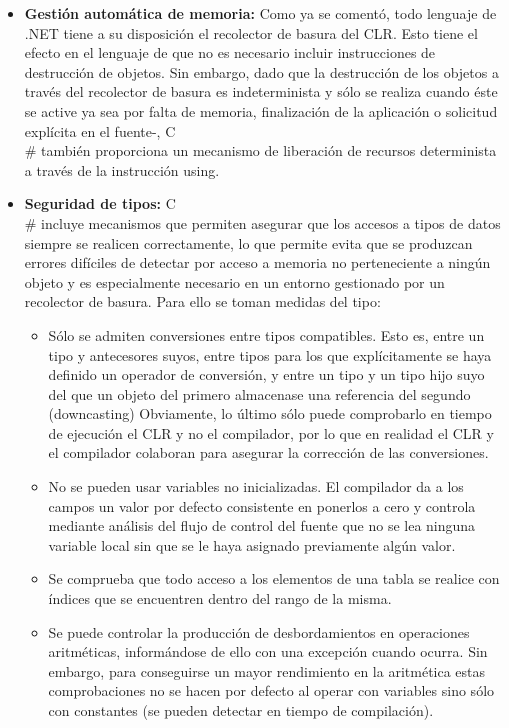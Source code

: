 \begin{itemize}
		\item \textbf{Gesti\'on autom\'atica de memoria: } Como ya se coment\'o, todo lenguaje de .NET tiene a su disposici\'on el recolector de basura del CLR. Esto tiene el efecto en el lenguaje de que no es necesario incluir instrucciones de destrucci\'on de objetos. Sin embargo, dado que la destrucci\'on de los objetos a trav\'es del recolector de basura es indeterminista y s\'olo se realiza cuando \'este se active ya sea por falta de memoria, finalizaci\'on de la aplicaci\'on o solicitud expl\'icita en el fuente-, C\\# tambi\'en proporciona un mecanismo de liberaci\'on de recursos determinista a trav\'es de la instrucci\'on using. 

		\item \textbf{Seguridad de tipos: } C\\# incluye mecanismos que permiten asegurar que los accesos a tipos de datos siempre se realicen correctamente, lo que permite evita que se produzcan errores dif\'iciles de detectar por acceso a memoria no perteneciente a ning\'un objeto y es especialmente necesario en un entorno gestionado por un recolector de basura. Para ello se toman medidas del tipo: 
		\begin{itemize}
			\item S\'olo se admiten conversiones entre tipos compatibles. Esto es, entre un tipo y antecesores suyos, entre tipos para los que expl\'icitamente se haya definido un operador de conversi\'on, y entre un tipo y un tipo hijo suyo del que un objeto del primero almacenase una referencia del segundo (downcasting) Obviamente, lo \'ultimo s\'olo puede comprobarlo en tiempo de ejecuci\'on el CLR y no el compilador, por lo que en realidad el CLR y el compilador colaboran para asegurar la correcci\'on de las conversiones. 
			\item No se pueden usar variables no inicializadas. El compilador da a los campos un valor por defecto consistente en ponerlos a cero y controla mediante an\'alisis del flujo de control del fuente que no se lea ninguna variable local sin que se le haya asignado previamente alg\'un valor. 
			\item Se comprueba que todo acceso a los elementos de una tabla se realice con \'indices que se encuentren dentro del rango de la misma. 
			\item Se puede controlar la producci\'on de desbordamientos en operaciones aritm\'eticas, inform\'andose de ello con una excepci\'on cuando ocurra. Sin embargo, para conseguirse un mayor rendimiento en la aritm\'etica estas comprobaciones no se hacen por defecto al operar con variables sino s\'olo con constantes (se pueden detectar en tiempo de compilaci\'on).

\end{itemize}
\end{itemize}
